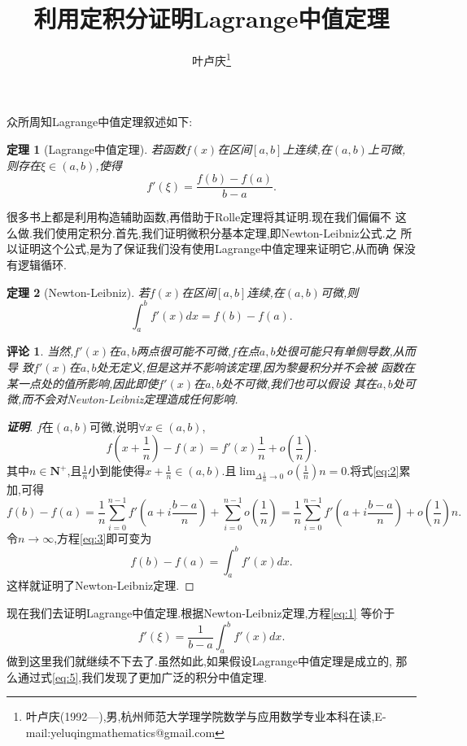 \documentclass[a4paper]{article}
\newtheorem*{theo}{定理}
\newtheorem*{rem}{评论}
\newenvironment{theorem}
{\bigskip\begin{mdframed}\begin{theo}}
    {\end{theo}\end{mdframed}\bigskip}
\newenvironment{remark}
{\begin{mdframed}\begin{rem}}
    {\end{rem}\end{mdframed}\bigskip}
\begin{document}
\title{\huge{\bf{利用定积分证明Lagrange中值定理}}} \author{\small{叶卢庆\footnote{叶卢庆(1992---),男,杭州师范大学理学院数学与应用数学专业本科在读,E-mail:yeluqingmathematics@gmail.com}}}
\maketitle
众所周知Lagrange中值定理叙述如下:
\begin{theorem}[Lagrange中值定理]
  若函数$f(x)$在区间$[a,b]$上连续,在$(a,b)$上可微,则存在$\xi\in
  (a,b)$,使得
\begin{equation}\label{eq:1}
f'(\xi)=\frac{f(b)-f(a)}{b-a}.
\end{equation}
\end{theorem}
很多书上都是利用构造辅助函数,再借助于Rolle定理将其证明.现在我们偏偏不
这么做.我们使用定积分.首先,我们证明微积分基本定理,即Newton-Leibniz公式.之
所以证明这个公式,是为了保证我们没有使用Lagrange中值定理来证明它,从而确
保没有逻辑循环.
\begin{theorem}[Newton-Leibniz]
若$f(x)$在区间$[a,b]$连续,在$(a,b)$可微,则
$$
\int_a^bf'(x)dx=f(b)-f(a).
$$
\end{theorem}
\begin{remark}
当然,$f'(x)$在$a,b$两点很可能不可微,$f$在点$a,b$处很可能只有单侧导数,从而导
致$f'(x)$在$a,b$处无定义,但是这并不影响该定理,因为黎曼积分并不会被
函数在某一点处的值所影响,因此即使$f'(x)$在$a,b$处不可微,我们也可以假设
其在$a,b$处可微,而不会对Newton-Leibniz定理造成任何影响.
\end{remark}
\begin{proof}[\textbf{证明}]
$f$在$(a,b)$可微,说明$\forall x\in (a,b)$,
\begin{equation}\label{eq:2}
f(x+\frac{1}{n})-f(x)=f'(x)\frac{1}{n}+o(\frac{1}{n}).
\end{equation}
其中$n\in \mathbf{N}^+$,且$\frac{1}{n}$小到能使得$x+\frac{1}{n}\in (a,b)$.且$\lim_{\Delta \frac{1}{n}\to
  0}o(\frac{1}{n})n=0$.将式\eqref{eq:2}累加,可得
\begin{equation}\label{eq:3}
f(b)-f(a)=\frac{1}{n}\sum_{i=0}^{n-1} f'(a+i \frac{b-a}{n})+\sum_{i=0}^{n-1} o(\frac{1}{n})=\frac{1}{n}\sum_{i=0}^{n-1} f'(a+i \frac{b-a}{n})+o(\frac{1}{n})n.
\end{equation}
令$n\to\infty$,方程\eqref{eq:3}即可变为
\begin{equation}
  \label{eq:4}
  f(b)-f(a)=\int_a^bf'(x)dx.
\end{equation}
这样就证明了Newton-Leibniz定理.
\end{proof}
现在我们去证明Lagrange中值定理.根据Newton-Leibniz定理,方程\eqref{eq:1}
等价于
\begin{equation}
  \label{eq:5}
f'(\xi)=\frac{1}{b-a}\int_a^bf'(x)dx.
\end{equation}
做到这里我们就继续不下去了.虽然如此,如果假设Lagrange中值定理是成立的,
那么通过式\eqref{eq:5},我们发现了更加广泛的积分中值定理.
\end{document}
